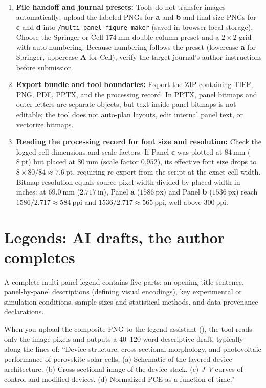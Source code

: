 \begin{enumerate}
\item \textbf{File handoff and journal presets:} Tools do not transfer images automatically; upload the labeled PNGs for \textbf{a} and \textbf{b} and final-size PNGs for \textbf{c} and \textbf{d} into \texttt{/multi-panel-\allowbreak figure-\allowbreak maker} (saved in browser local storage). Choose the Springer or Cell $174\ \text{mm}$ double-column preset and a $2 \times 2$ grid with auto-numbering. Because numbering follows the preset (lowercase \textbf{a} for Springer, uppercase \textbf{A} for Cell), verify the target journal's author instructions before submission.
\item \textbf{Export bundle and tool boundaries:} Export the ZIP containing TIFF, PNG, PDF, PPTX, and the processing record. In PPTX, panel bitmaps and outer letters are separate objects, but text inside panel bitmaps is not editable; the tool does not auto-plan layouts, edit internal panel text, or vectorize bitmaps.
\item \textbf{Reading the processing record for font size and resolution:} Check the logged cell dimensions and scale factors. If Panel \textbf{c} was plotted at $84\ \text{mm}$ ($8\ \text{pt}$) but placed at $80\ \text{mm}$ (scale factor $0.952$), its effective font size drops to $8 \times 80 / 84 \approx 7.6\ \text{pt}$, requiring re-export from the script at the exact cell width. Bitmap resolution equals source pixel width divided by placed width in inches: at $69.0\ \text{mm}$ ($2.717\ \text{in}$), Panel \textbf{a} ($1586\ \text{px}$) and Panel \textbf{b} ($1536\ \text{px}$) reach $1586 / 2.717 \approx 584\ \text{ppi}$ and $1536 / 2.717 \approx 565\ \text{ppi}$, well above $300\ \text{ppi}$.
\end{enumerate}

\section{Legends: AI drafts, the author completes}

A complete multi-panel legend contains five parts: an opening title sentence, panel-by-panel descriptions (defining visual encodings), key experimental or simulation conditions, sample sizes and statistical methods, and data provenance declarations.

When you upload the composite PNG to the \scidraw{} legend assistant (), the tool reads only the image pixels and outputs a 40--120 word descriptive draft, typically along the lines of: ``Device structure, cross-sectional morphology, and photovoltaic performance of perovskite solar cells. (a) Schematic of the layered device architecture. (b) Cross-sectional image of the device stack. (c) $J\text{--}V$ curves of control and modified devices. (d) Normalized PCE as a function of time.''

